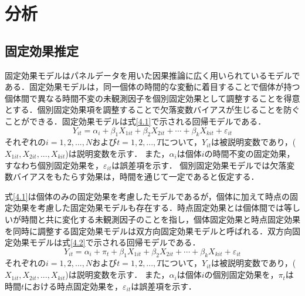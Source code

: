 \chapter{分析}

\section{固定効果推定}
固定効果モデルはパネルデータを用いた因果推論に広く用いられているモデルである．固定効果モデルは，同一個体の時間的な変動に着目することで個体が持つ個体間で異なる時間不変の未観測因子を個別固定効果として調整することを得意とする．個別固定効果項を調整することで欠落変数バイアスが生じることを防ぐことができる．固定効果モデルは式\ref{4.1}で示される回帰モデルである．
\begin{equation}
  Y_{it} = \alpha_{i} + \beta_{1}X_{1it} + \beta_{2}X_{2it} + \cdots  + \beta_{k}X_{kit} + \varepsilon_{it}
  \label{4.1}
\end{equation}
それぞれの$i=1,2,...,N$および$t=1,2,...,T$について，$Y_{it}$は被説明変数であり，($X_{1it},X_{2it},...,X_{kit}$)は説明変数を示す．
また，$\alpha_{i}$は個体$i$の時間不変の固定効果，すなわち個別固定効果を，$\varepsilon_{it}$は誤差項を示す．
個別固定効果モデルでは欠落変数バイアスをもたらす効果は，時間を通じて一定であると仮定する．

式\ref{4.1}は個体のみの固定効果を考慮したモデルであるが，個体に加えて時点の固定効果を考慮した固定効果モデルも存在する．時点固定効果とは個体間では等しいが時間と共に変化する未観測因子のことを指し，個体固定効果と時点固定効果を同時に調整する固定効果モデルは双方向固定効果モデルと呼ばれる．双方向固定効果モデルは式\ref{4.2}で示される回帰モデルである．
\begin{equation}
  Y_{it} = \alpha_{i} + \pi_{t} + \beta_{1}X_{1it} + \beta_{2}X_{2it} + \cdots  + \beta_{k}X_{kit} + \varepsilon_{it}
  \label{4.2}
\end{equation}
それぞれの$i=1,2,...,N$および$t=1,2,...,T$について，$Y_{it}$は被説明変数であり，($X_{1it},X_{2it},...,X_{kit}$)は説明変数を示す．
また，$\alpha_{i}$は個体$i$の個別固定効果を，$\pi_{t}$は時間$t$における時点固定効果を，$\varepsilon_{it}$は誤差項を示す．

